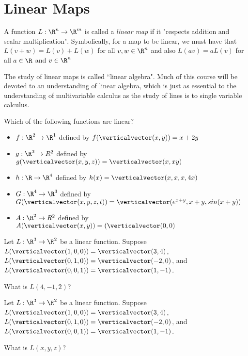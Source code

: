 
\section{Linear Maps}

\begin{definition}
	A function $L: \R^n \to \R^m$ is called a \textit{linear map} if it "respects addition and scalar multiplication".
	Symbolically, for a map to be linear, we must have that $L(v+w) = L(v)+L(w)$ for all $v,w \in \R^n$ and also
	$L(av) = a L(v)$ for all $a \in \R$ and $v\in \R^n$
\end{definition}

The study of linear maps is called ``linear algebra".  Much of this course will be devoted to an understanding of linear algebra, which is just as essential
to the understanding of multivariable calculus as the study of lines is to single variable calculus.

	\begin{question}
		Which of the following functions are linear?
		\begin{itemize}
			\item $f: \R^2 \to \R^1$ defined by $f(\verticalvector(x,y)) = x+2y$
			\item $g: \R^3 \to R^2$ defined by $g(\verticalvector(x,y,z)) = \verticalvector(x,xy)$
			\item $h:\R \to \R^4$ defined by $h(x) = \verticalvector(x,x,x,4x)$
			\item $G: \R^4 \to  \R^3$ defined by $G(\verticalvector(x,y,z,t)) = \verticalvector(e^{x+y},x+y,sin(x+y))$
			\item $A: \R^2 \to R^2$ defined by $A(\verticalvector(x,y))=(\verticalvector(0,0)$
		\end{itemize}
	\end{question}
	
	\begin{question}
	 	Let $L:\R^3 \to \R^2$ be a linear function.  Suppose $L(\verticalvector(1,0,0)) = \verticalvector(3,4)$, 
	 	 $L(\verticalvector(0,1,0)) = \verticalvector(-2,0)$,  and  $L(\verticalvector(0,0,1)) = \verticalvector(1,-1)$.
	 	 
	 	What is $L(4,-1,2)$?
	\end{question}
	
	\begin{question}
	 	Let $L:\R^3 \to \R^2$ be a linear function.  Suppose $L(\verticalvector(1,0,0)) = \verticalvector(3,4)$, 
	 	 $L(\verticalvector(0,1,0)) = \verticalvector(-2,0)$,  and  $L(\verticalvector(0,0,1)) = \verticalvector(1,-1)$.
	 	 
	 	What is $L(x,y,z)$?
	\end{question}
	
